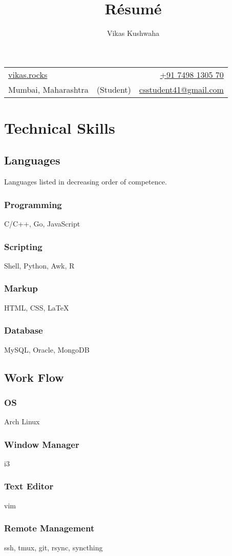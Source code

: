 \documentclass[letterpaper,12pt]{extarticle}
\title{R\'esum\'e}
\author{Vikas Kushwaha}
\begin{document}
\noindent
\begin{tabular*}{\textwidth}{@{\extracolsep{\fill}}lcr}
	\href{https://vikas.rocks}{\underline{vikas.rocks}} &
	\href{https://vikas.rocks}{\Large\bfseries \theauthor} &
	\href{tel:+917498130470}{+91 7498 1305 70} \\
	Mumbai, Maharashtra &
	(Student) \thetitle &
	\href{mailto:csstudent41@gmail.com}{csstudent41@gmail.com}
\end{tabular*}

\section{Technical Skills}

\begin{minipage}[t]{0.5\textwidth}
	\subsection{Languages} Languages listed in decreasing order of competence.
	\subsubsection{Programming} C/C++, Go, JavaScript
	\subsubsection{Scripting} Shell, Python, Awk, R
	\subsubsection{Markup} HTML, CSS, {\LaTeX}
	\subsubsection{Database}
	MySQL, Oracle, MongoDB
\end{minipage}
\hfill
\vrule
\hfill
\begin{minipage}[t]{0.45\textwidth}
	\subsection{Work Flow}
	\subsubsection{OS} Arch Linux
	\subsubsection{Window Manager} i3
	\subsubsection{Text Editor} vim
	\subsubsection{Remote Management} ssh, tmux, git, rsync, syncthing
\end{minipage}
\end{document}
